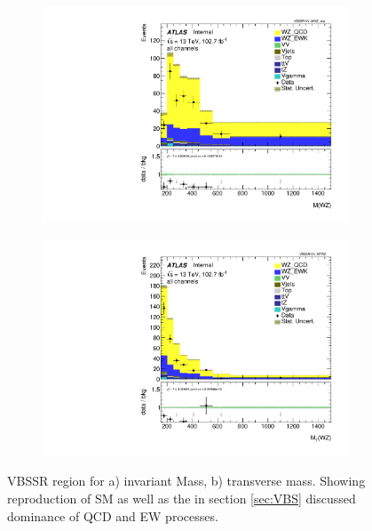 \documentclass[../Bachelorarbeit.tex]{subfiles}
\begin{document}
\begin{figure}[h]
    \centering
    \begin{subfigure}{0.45\textwidth}
        \centering
        \includegraphics[width=\textwidth]{Plots/SM_reproduction/all_VV_MWZ_vbs.pdf}
        \caption{}
    \end{subfigure}
    \begin{subfigure}{0.45\textwidth}
        \centering
        \includegraphics[width=\textwidth]{Plots/SM_reproduction/all_VV_MTWZ.pdf}
        \caption{}
    \end{subfigure}
    \caption{VBSSR region for a) invariant Mass, b) transverse mass. Showing reproduction of SM as well as the in section \ref{sec:VBS} discussed dominance of QCD and EW processes. }
    \label{fig:SM_re}
\end{figure}
\end{document}
